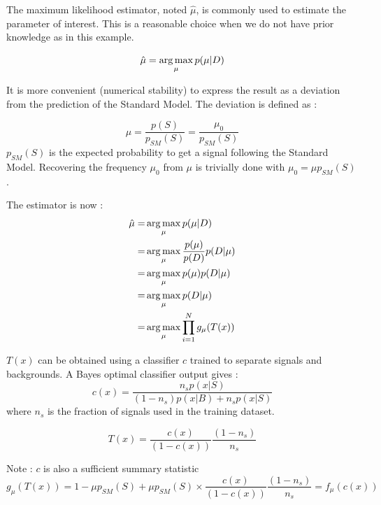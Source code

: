The maximum likelihood estimator, noted $\hat \mu$, is commonly used to estimate the parameter of interest.
This is a reasonable choice when we do not have prior knowledge as in this example.

\begin{equation}
	\hat \mu = \operatorname*{arg\,max}_\mu p(\mu | D)
\end{equation}

It is more convenient (numerical stability) to express the result as a deviation from the prediction of the Standard Model.
The deviation is defined as :

\begin{equation}
	\mu = \frac{p(S)}{p_{SM}(S)} = \frac{\mu_0}{p_{SM}(S)}
\end{equation}
$p_{SM}(S)$ is the expected probability to get a signal following the Standard Model.
Recovering the frequency $\mu_0$ from $\mu$ is trivially done with $\mu_0 = \mu p_{SM}(S)$.

The estimator is now :
\begin{align}
	\hat\mu =& \operatorname*{arg\,max}_\mu p(\mu | D) \\
	     =& \operatorname*{arg\,max}_\mu \frac{p(\mu)}{p(D)} p(D | \mu) \\
	     =& \operatorname*{arg\,max}_\mu p(\mu) p(D | \mu) \\
	     =& \operatorname*{arg\,max}_\mu  p(D | \mu) \\
	     =& \operatorname*{arg\,max}_\mu  \prod_{i=1}^N g_\mu(T(x)) \\
\end{align}


$T(x)$ can be obtained using a classifier $c$ trained to separate signals and backgrounds.
A Bayes optimal classifier output gives :
\begin{equation}
	c(x) = \frac{n_s p(x|S)}{(1-n_s) p(x|B) + n_s p(x|S)}
\end{equation}
where $n_s$ is the fraction of signals used in the training dataset.

\begin{equation}
	T(x) = \frac{c(x)}{(1-c(x))} \frac{(1-n_s)}{n_s} 
\end{equation}


Note : $c$ is also a sufficient summary statistic
\begin{equation}
	g_\mu(T(x)) = 1 - \mu p_{SM}(S) + \mu p_{SM}(S) \times \frac{c(x)}{(1-c(x))} \frac{(1-n_s)}{n_s} = f_\mu(c(x))
\end{equation}






